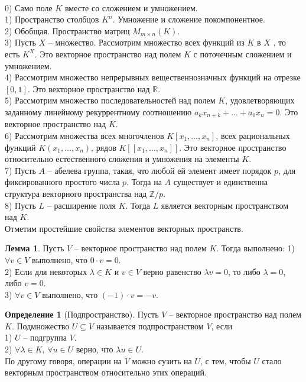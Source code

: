 \documentclass[10pt,a4paper,oneside]{book}
\theoremstyle{definition}
\newtheorem{defn}{Определение}
\newtheorem{lem}{Лемма}
\newcommand{\mb}[1]{\mathbb{#1}}
\def\exm{\noindent {\bf Примеры:}}
\def\dfn{\begin{defn}}
\def\edfn{\end{defn}}
\def\lm{\begin{lem}}
\def\elm{\end{lem}}
\begin{document}
\exm\\
0) Само поле $K$ вместе со сложением и умножением.\\
1) Пространство столбцов $K^n$. Умножение и сложение покомпонентное.\\
2) Обобщая. Пространство матриц $M_{m\times n}(K)$.\\

3) Пусть $X$ -- множество. Рассмотрим множество всех функций  из $K$ в $X$ , то есть $K^X$. Это векторное пространство над полем $K$ с поточечным сложением и умножением.\\
4) Рассмотрим множество непрерывных вещественнозначных функций на отрезке $[0,1]$. Это векторное пространство над $\mb R$.\\
5) Рассмотрим множество последовательностей над полем $K$, удовлетворяющих заданному линейному рекуррентному соотношению $a_k x_{n+k}+\dots+a_0x_n=0$. Это векторное пространство над $K$.\\
6) Рассмотрим множества всех многочленов $K[x_1,\dots,x_n]$, всех рациональных функций $K(x_1,\dots, x_n)$, рядов $K[[x_1,\dots,x_n]]$. Это векторное пространство относительно естественного сложения и умножения на элементы $K$.\\
7) Пусть $A$ -- абелева группа, такая, что любой ей элемент имеет порядок $p$, для фиксированного простого числа $p$. Тогда на $A$ существует и единственна структура векторного пространства над $\mb Z/p$.\\
8) Пусть $L$ -- расширение поля $K$. Тогда $L$ является векторным пространством над $K$.\\



Отметим простейшие свойства элементов векторных пространств.
\lm Пусть $V$ -- векторное пространство над полем $K$. Тогда выполнено:
1) $\forall v  \in V$ выполнено, что $0\cdot v =0$.\\
2) Если для некоторых $\lambda \in K$ и $v \in V$ верно равенство $\lambda v =0$, то либо $\lambda=0$, либо $v=0$.\\
3) $\forall v  \in V$ выполнено, что $(-1)\cdot v=-v$.\\
\elm









\dfn[Подпространство] Пусть $V$ -- векторное пространство над полем $K$. Подмножество $U\subseteq V$ называется подпространством $V$, если\\
1) $U$ -- подгруппа $V$.\\
2) $\forall \lambda \in K$, $\forall u \in U$ верно, что $\lambda u \in U$.\\
По другому говоря,  операции на $V$ можно сузить на $U$, с тем, чтобы $
U$ стало векторным пространством относительно этих операций.
\edfn
\end{document}
